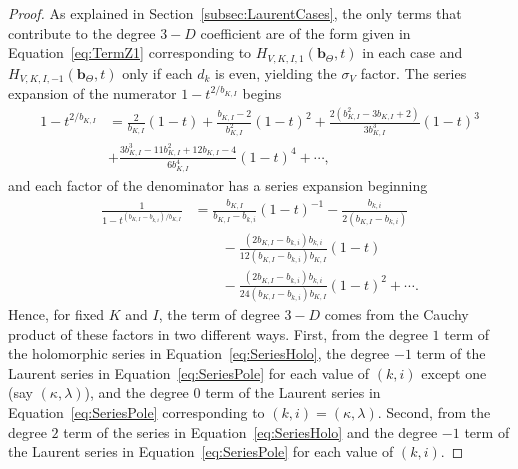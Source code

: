 \documentclass{amsart}
\theoremstyle{definition}
\theoremstyle{remark}
\newcommand{\bs}{\boldsymbol}
\begin{document}
\begin{proof}
As explained in Section~\ref{subsec:LaurentCases}, the only terms that contribute to the degree $3-D$
coefficient are of the form given in Equation~\eqref{eq:TermZ1}
corresponding to $H_{V,K,I,1}(\bs{b}_\Theta,t)$ in each case and $H_{V,K,I,-1}(\bs{b}_\Theta,t)$ only if each
$d_k$ is even, yielding the $\sigma_V$ factor. The series expansion of the numerator $1 - t^{2/b_{K,I}}$ begins
\begin{align}
\label{eq:SeriesHolo}
    1 - t^{2/b_{K,I}}
        &=  \frac{2}{b_{K,I}} (1 - t) + \frac{b_{K,I} - 2}{b_{K,I}^2} (1 - t)^2
            + \frac{2(b_{K,I}^2 - 3b_{K,I} + 2)}{3b_{K,I}^3} (1 - t)^3
        \\ \nonumber &
            + \frac{3b_{K,I}^3 - 11b_{K,I}^2 + 12b_{K,I} - 4}{6b_{K,I}^4} (1 - t)^4
            + \cdots,
\end{align}
and each factor of the denominator has a series expansion beginning
\begin{align}
\label{eq:SeriesPole}
    \frac{1}{1 - t^{(b_{K,I} - b_{k,i})/b_{K,I}}}
        &=  \frac{b_{K,I}}{b_{K,I} - b_{k,i}} (1 - t)^{-1} - \frac{b_{k,i}}{2(b_{K,I} - b_{k,i})}
        \\ \nonumber &\quad\quad
            - \frac{(2 b_{K,I} - b_{k,i})b_{k,i}}{12(b_{K,I} - b_{k,i})b_{K,I} } (1 - t)
        \\ \nonumber &\quad\quad
            - \frac{(2 b_{K,I} - b_{k,i})b_{k,i}}{24(b_{K,I} - b_{k,i})b_{K,I} } (1 - t)^2
            + \cdots.
\end{align}
Hence, for fixed $K$ and $I$, the term of degree $3 - D$ comes from the Cauchy product of these factors
in two different ways. First, from the degree $1$ term of the holomorphic series in Equation~\eqref{eq:SeriesHolo},
the degree $-1$ term of the Laurent series in Equation~\eqref{eq:SeriesPole} for each value of $(k, i)$ except one
(say $(\kappa, \lambda)$), and the degree $0$ term of the Laurent series in Equation~\eqref{eq:SeriesPole} corresponding
to $(k,i) = (\kappa,\lambda)$. Second, from the degree $2$ term of the series in Equation~\eqref{eq:SeriesHolo}
and the degree $-1$ term of the Laurent series in Equation~\eqref{eq:SeriesPole} for each value of $(k, i)$.


\end{proof}
\end{document}
